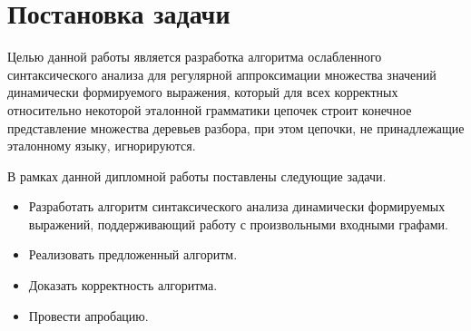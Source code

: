 \section{Постановка задачи}
Целью данной работы является разработка алгоритма ослабленного синтаксического 
анализа для регулярной аппроксимации множества значений динамически формируемого
выражения, который для всех корректных относительно некоторой эталонной 
грамматики цепочек строит конечное представление множества деревьев разбора, при
этом цепочки, не принадлежащие эталонному языку, игнорируются.

В рамках данной дипломной работы поставлены следующие задачи.
\begin{itemize}
  \item Разработать алгоритм синтаксического анализа динамически формируемых 
        выражений, поддерживающий работу с произвольными входными графами.
  \item Реализовать предложенный алгоритм.
  \item Доказать корректность алгоритма.
  \item Провести апробацию.
\end{itemize}